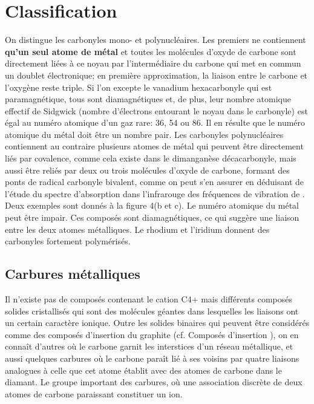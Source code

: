 \documentclass[]{article}
\begin{document}
\section{Classification} 

On distingue les carbonyles mono- et polynucléaires. Les premiers
ne contiennent \textbf{qu'un seul atome de métal} et toutes les molécules
d'oxyde de carbone sont directement liées à ce noyau par
l'intermédiaire du carbone qui met en commun un doublet
électronique; en première approximation, la liaison entre le
carbone et l'oxygène reste triple. Si l'on excepte le vanadium
hexacarbonyle qui est paramagnétique, tous sont diamagnétiques
et, de plus, leur nombre atomique effectif de Sidgwick (nombre
d'électrons entourant le noyau dans le carbonyle) est égal au
numéro atomique d'un gaz rare: 36, 54 ou 86. Il en résulte que
le numéro atomique du métal doit être un nombre pair. Les
carbonyles polynucléaires contiennent au contraire plusieurs atomes
de métal qui peuvent être directement liés par covalence,
comme cela existe dans le dimanganèse décacarbonyle, mais aussi
être reliés par deux ou trois molécules d'oxyde de carbone,
formant des ponts de radical carbonyle bivalent, comme on peut s'en
assurer en déduisant de l'étude du spectre d'absorption dans
l'infrarouge des fréquences de vibration de . Deux
exemples sont donnés à la figure 4(b et c). Le numéro
atomique du métal peut être impair. Ces composés sont
diamagnétiques, ce qui suggère une liaison entre les deux atomes
métalliques. Le rhodium et l'iridium donnent des carbonyles
fortement polymérisés.

\subsection{Carbures métalliques} 

Il n'existe pas de composés contenant le cation C4+ mais
différents composés solides cristallisés qui sont des
molécules géantes dans lesquelles les liaisons ont un certain
caractère ionique. Outre les solides binaires qui peuvent être
considérés comme des composés d'insertion du graphite
(cf. Composés d'insertion ), on en connaît d'autres où le
carbone garnit les interstices d'un réseau métallique, et aussi
quelques carbures où le carbone paraît lié à ses voisins
par quatre liaisons analogues à celle que cet atome établit avec
des atomes de carbone dans le diamant.  Le groupe important des
carbures, où une association discrète de deux atomes de carbone
paraissant constituer un ion.
\end{document}
